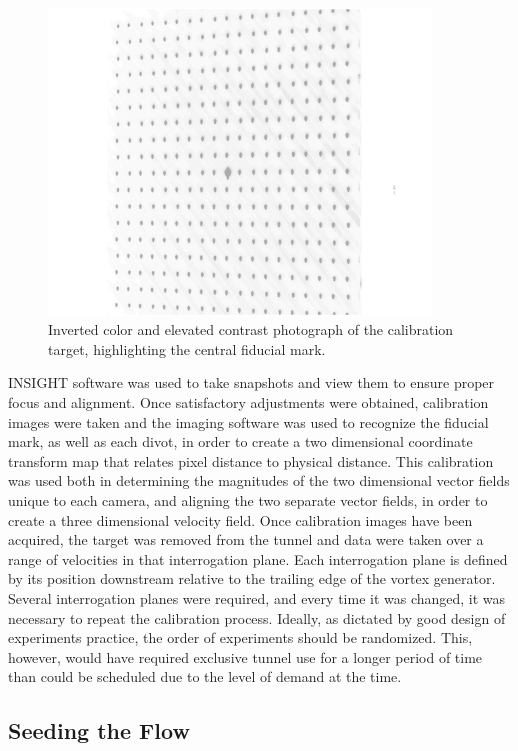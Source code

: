 \begin{figure}[H]
	\centering
	\includegraphics[width=4in]{figs/piv_method/calibration_target}
	\caption{Inverted color and elevated contrast photograph of the calibration 
		target, highlighting the central fiducial mark.}
	\label{fig:calibration_target}
\end{figure}


INSIGHT software was used to take snapshots and view them to ensure proper 
focus 
and alignment. Once satisfactory adjustments were obtained, calibration images 
were taken and the imaging software was used to recognize the fiducial mark, as 
well as each divot, in order to create a two dimensional coordinate transform 
map that relates 
pixel distance to physical distance. This calibration was used both in 
determining the magnitudes of the two dimensional vector fields unique to each 
camera, and aligning the two separate vector fields, in order to create a three 
dimensional velocity field. Once calibration images have been acquired, the 
target 
was removed from the tunnel and data were taken over a range of velocities in 
that interrogation plane. Each interrogation plane is defined by its position 
downstream relative to the trailing edge of the vortex generator. Several 
interrogation planes were required, and every time it was changed, it was 
necessary to repeat the calibration process. Ideally, as dictated by good 
design of experiments 
practice, the order of experiments should be randomized. This, however, would 
have required exclusive tunnel use for a longer period of time than could be 
scheduled due to the level of demand at the time.

\subsection{Seeding the Flow}

